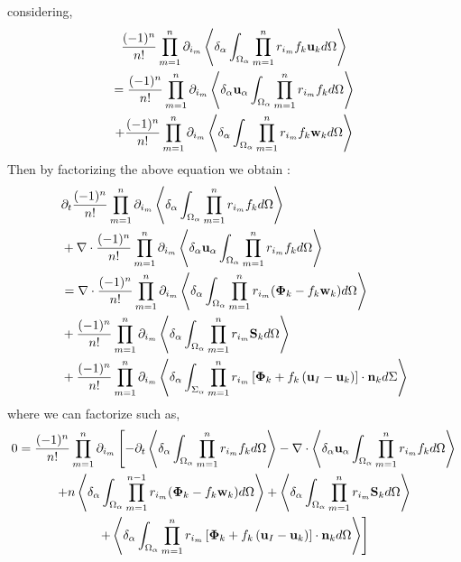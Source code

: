 considering, 
\begin{multline}
    \expo{f_k \textbf{u}_k}\\
    =     \expoU{f_k }\\
    +     \expo{f_k \textbf{w}_k}
\end{multline}
Then by factorizing the above equation we obtain : 
\begin{align}
    & \pddt \expo{f_k} \\
    &+ \nablabh \cdot \expoU{f_k}\\
    &= \nablabh \cdot \expo{(\mathbf{\Phi}_k - f_k \textbf{w}_k)}\\
    &+ \expo{ \textbf{S}_k}\\
    &+ \expoS{\left[
        \mathbf{\Phi}_k
        + f_k
        \left(
            \textbf{u}_I
            - \textbf{u}_k
        \right)
    \right]
    \cdot \textbf{n}_k} \\
\end{align}
where we can factorize such as, 
\begin{multline*}
    0 = \frac{(-1)^n}{n!}
    \partialp{1}{n}
    \left[
        - \partial_t
        \pavg{\int_{\Omega_\alpha} \pri{1}{n}f_k d\Omega}
        - \nablab \cdot \pavg{\textbf{u}_\alpha \int_{\Omega_\alpha} \pri{1}{n}f_k d\Omega}
    \right.\\\left.
        +n\pavg{\int_{\Omega_\alpha} \pri{1}{n-1} (\mathbf{\Phi}_k - f_k \textbf{w}_k) d\Omega}
        +\pavg{\int_{\Omega_\alpha} \pri{1}{n} \textbf{S}_k d\Omega}
        \right.\\\left.
        +\pavg{\int_{\Omega_\alpha} \pri{1}{n} \left[
            \mathbf{\Phi}_k
            + f_k
            \left(
                \textbf{u}_I
                - \textbf{u}_k
            \right)
        \right]
        \cdot \textbf{n}_kd\Omega}
    \right]
\end{multline*}